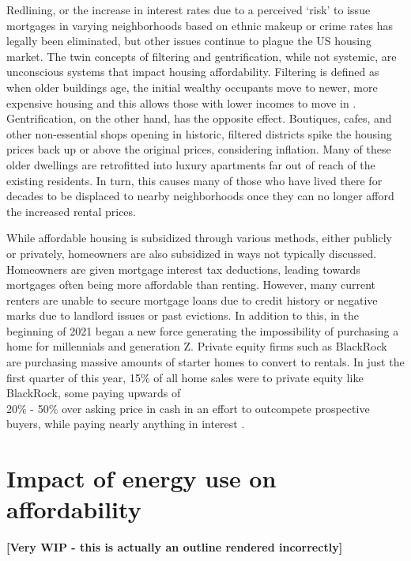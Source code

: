 Redlining, or the increase in interest rates due to a perceived ‘risk’ to issue mortgages in varying neighborhoods based on ethnic makeup or crime rates has legally been eliminated, but other issues continue to plague the US housing market. The twin concepts of filtering and gentrification, while not systemic, are unconscious systems that impact housing affordability. Filtering is defined as when older buildings age, the initial wealthy occupants move to newer, more expensive housing and this allows those with lower incomes to move in \cite{hertzWhatFilteringCan}. Gentrification, on the other hand, has the opposite effect. Boutiques, cafes, and other non-essential shops opening in historic, filtered districts spike the housing prices back up or above the original prices, considering inflation. Many of these older dwellings are retrofitted into luxury apartments far out of reach of the existing residents. In turn, this causes many of those who have lived there for decades to be displaced to nearby neighborhoods once they can no longer afford the increased rental prices. 
 
While affordable housing is subsidized through various methods, either publicly or privately, homeowners are also subsidized in ways not typically discussed. Homeowners are given mortgage interest tax deductions, leading towards mortgages often being more affordable than renting. However, many current renters are unable to secure mortgage loans due to credit history or negative marks due to landlord issues or past evictions. In addition to this, in the beginning of 2021 began a new force generating the impossibility of purchasing a home for millennials and generation Z. Private equity firms such as BlackRock are purchasing massive amounts of starter homes to convert to rentals. In just the first quarter of this year, 15\% of all home sales were to private equity like BlackRock, some paying upwards of \\ 20\% - 50\% over asking price in cash in an effort to outcompete prospective buyers, while paying nearly anything in interest \cite{botellaInvestmentFirmsAren}. 

\section{Impact of energy use on affordability}

\textbf{[Very WIP - this is actually an outline rendered incorrectly]}

